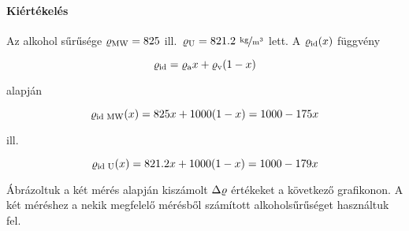 \documentclass[12pt]{article}
\begin{document}
\paragraph{Kiértékelés}

Az alkohol sűrűsége $\varrho_{\text{MW}} = 825$ ill.\ $\varrho_{\text{U}} = 821.2$ $\unitfrac{kg}{m^3}$ lett. A $\varrho_{\text{id}}(x)$ függvény 
 
\[ \varrho_{\text{id}} = \varrho_{\text{a}} x + \varrho_{\text{v}} (1-x) \]

 alapján

 \[ \varrho_{\text{id MW}}(x) = 825 x +  1000 (1-x) = 
   1000 - 175 x
   \]

ill.

 \[ \varrho_{\text{id U}}(x) = 821.2 x +  1000 (1-x) = 
   1000 - 179 x
 \]


Ábrázoltuk a két mérés alapján kiszámolt $\Delta\varrho$ értékeket a következő grafikonon. A két méréshez a nekik megfelelő mérésből számított alkoholsűrűséget használtuk fel.
\end{document}
